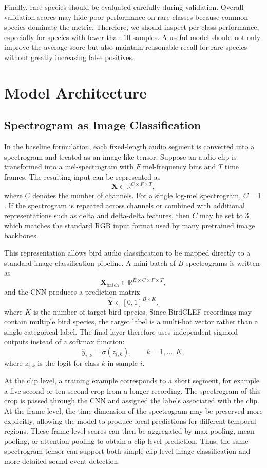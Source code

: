 \documentclass[a4paper,12pt]{article}
\begin{document}
Finally, rare species should be evaluated carefully during validation. Overall validation scores may hide poor performance on rare classes because common species dominate the metric. Therefore, we should inspect per-class performance, especially for species with fewer than $10$ samples. A useful model should not only improve the average score but also maintain reasonable recall for rare species without greatly increasing false positives.

\section{Model Architecture}
\label{sec:model-architecture}

\subsection{Spectrogram as Image Classification}

In the baseline formulation, each fixed-length audio segment is converted into a spectrogram and treated as an image-like tensor. Suppose an audio clip is transformed into a mel-spectrogram with $F$ mel-frequency bins and $T$ time frames. The resulting input can be represented as
\[
\mathbf{X}\in\mathbb{R}^{C\times F\times T},
\]
where $C$ denotes the number of channels. For a single log-mel spectrogram, $C=1$. If the spectrogram is repeated across channels or combined with additional representations such as delta and delta-delta features, then $C$ may be set to $3$, which matches the standard RGB input format used by many pretrained image backbones.

This representation allows bird audio classification to be mapped directly to a standard image classification pipeline. A mini-batch of $B$ spectrograms is written as
\[
\mathbf{X}_{\text{batch}}\in\mathbb{R}^{B\times C\times F\times T},
\]
and the CNN produces a prediction matrix
\[
\hat{\mathbf{Y}}\in[0,1]^{B\times K},
\]
where $K$ is the number of target bird species. Since BirdCLEF recordings may contain multiple bird species, the target label is a multi-hot vector rather than a single categorical label. The final layer therefore uses independent sigmoid outputs instead of a softmax function:
\[
\hat{y}_{i,k}=\sigma(z_{i,k}),\qquad k=1,\ldots,K,
\]
where $z_{i,k}$ is the logit for class $k$ in sample $i$.

At the clip level, a training example corresponds to a short segment, for example a five-second or ten-second crop from a longer recording. The spectrogram of this crop is passed through the CNN and assigned the labels associated with the clip. At the frame level, the time dimension of the spectrogram may be preserved more explicitly, allowing the model to produce local predictions for different temporal regions. These frame-level scores can then be aggregated by max pooling, mean pooling, or attention pooling to obtain a clip-level prediction. Thus, the same spectrogram tensor can support both simple clip-level image classification and more detailed sound event detection.
\end{document}
